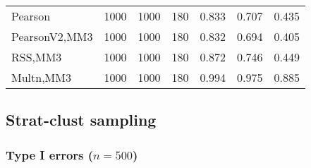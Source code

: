 \documentclass[
]{article}
\begin{document}
\begin{table}[H]
{\begin{tabular}[t]{lrrrrrr}
\hspace{1em}Pearson & 1000 & 1000 & 180 & 0.833 & 0.707 & 0.435\\
\hspace{1em}PearsonV2,MM3 & 1000 & 1000 & 180 & 0.832 & 0.694 & 0.405\\
\hspace{1em}RSS,MM3 & 1000 & 1000 & 180 & 0.872 & 0.746 & 0.449\\
\hspace{1em}Multn,MM3 & 1000 & 1000 & 180 & 0.994 & 0.975 & 0.885\\
\bottomrule
\end{tabular}}
\end{table}

\hypertarget{strat-clust-sampling}{%
\subsection{Strat-clust sampling}\label{strat-clust-sampling}}

\hypertarget{type-i-errors-n500-3}{%
\subsubsection{\texorpdfstring{Type I errors
(\(n=500\))}{Type I errors (n=500)}}\label{type-i-errors-n500-3}}
\end{document}
